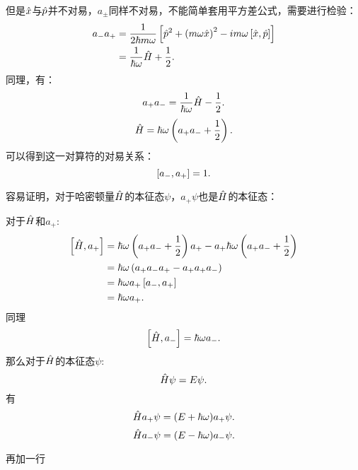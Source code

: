 但是$\hat{x}$与$\hat{p}$并不对易，$a_{\pm}$同样不对易，不能简单套用平方差公式，需要进行检验：
\begin{equation}
    \begin{aligned}
        a_-a_+&=\frac{1}{2\hbar m\omega}\left[\hat{p}^2+\left(m\omega\hat{x}\right)^2-im\omega\left[\hat{x},\hat{p}\right]\right]\\
        &=\frac{1}{\hbar\omega}\hat{H}+\frac{1}{2}.
    \end{aligned}
\end{equation}
同理，有：
\begin{equation}
    a_+a_-=\frac{1}{\hbar\omega}\hat{H}-\frac{1}{2}.
\end{equation}
\begin{equation}
    \hat{H}=\hbar\omega\left(a_+a_-+\frac{1}{2}\right).
\end{equation}
可以得到这一对算符的对易关系：
\begin{equation}
    \left[a_-,a_+\right]=1.
\end{equation}

容易证明，对于哈密顿量$\hat{H}$的本征态$\psi$，$a_+\psi$也是$\hat{H}$的本征态：

\begin{graybox}[Proof]
    对于$\hat{H}$和$a_+$:
    \begin{equation}
        \begin{aligned}
            \left[\hat{H},a_+\right]&=\hbar\omega\left(a_+a_-+\frac{1}{2}\right)a_+-a_+\hbar\omega\left(a_+a_-+\frac{1}{2}\right)\\
            &=\hbar\omega\left(a_+a_-a_+-a_+a_+a_-\right)\\
            &=\hbar\omega a_+\left[a_-,a_+\right]\\
            &=\hbar\omega a_+.
        \end{aligned}
    \end{equation}
    同理
    \begin{equation}
        \left[\hat{H},a_-\right]=\hbar\omega a_-.
    \end{equation}
    那么对于$\hat{H}$的本征态$\psi$:
    \begin{equation}
        \hat{H}\psi=E\psi.
    \end{equation}
    有 
    \begin{equation}
        \hat{H}a_+\psi=(E+\hbar\omega)a_+\psi.
    \end{equation}
    \begin{equation}
        \hat{H}a_-\psi=(E-\hbar\omega)a_-\psi.
    \end{equation}
\end{graybox}
再加一行


